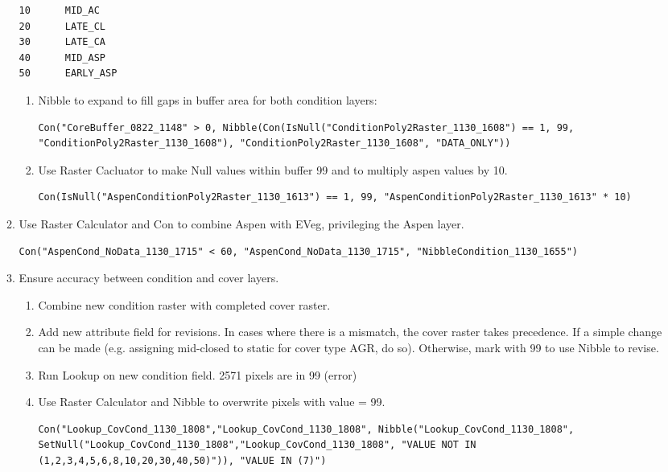 \begin{enumerate}
\begin{enumerate}
\begin{verbatim}
10      MID_AC
20      LATE_CL
30      LATE_CA
40      MID_ASP
50      EARLY_ASP
        \end{verbatim}
        \begin{enumerate}
            \item Nibble to expand to fill gaps in buffer area for both condition layers:
            \begin{lstlisting}
Con("CoreBuffer_0822_1148" > 0, Nibble(Con(IsNull("ConditionPoly2Raster_1130_1608") == 1, 99, "ConditionPoly2Raster_1130_1608"), "ConditionPoly2Raster_1130_1608", "DATA_ONLY")) \end{lstlisting}
            \item Use Raster Cacluator to make Null values within buffer 99 and to multiply aspen values by 10. \begin{lstlisting}
Con(IsNull("AspenConditionPoly2Raster_1130_1613") == 1, 99, "AspenConditionPoly2Raster_1130_1613" * 10)
            \end{lstlisting}
        \end{enumerate}
        \item Use Raster Calculator and Con to combine Aspen with EVeg, privileging the Aspen layer. \begin{lstlisting}
Con("AspenCond_NoData_1130_1715" < 60, "AspenCond_NoData_1130_1715", "NibbleCondition_1130_1655") \end{lstlisting}
        \item Ensure accuracy between condition and cover layers.
        \begin{enumerate}
            \item Combine new condition raster with completed cover raster.     
            \item Add new attribute field for revisions. In cases where there is a mismatch, the cover raster takes precedence. If a simple change can be made (e.g. assigning mid-closed to static for cover type AGR, do so). Otherwise, mark with 99 to use Nibble to revise.
            \item Run Lookup on new condition field. 2571 pixels are in 99 (error)
            \item Use Raster Calculator and Nibble to overwrite pixels with value = 99. \begin{lstlisting}
Con("Lookup_CovCond_1130_1808","Lookup_CovCond_1130_1808", Nibble("Lookup_CovCond_1130_1808", SetNull("Lookup_CovCond_1130_1808","Lookup_CovCond_1130_1808", "VALUE NOT IN (1,2,3,4,5,6,8,10,20,30,40,50)")), "VALUE IN (7)") \end{lstlisting}

\end{enumerate}
\end{enumerate}
\end{enumerate}
